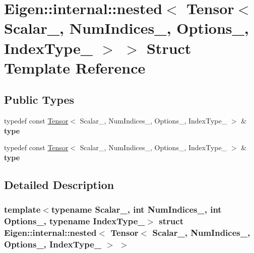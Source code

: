 \hypertarget{struct_eigen_1_1internal_1_1nested_3_01_tensor_3_01_scalar___00_01_num_indices___00_01_options___00_01_index_type___01_4_01_4}{}\section{Eigen\+:\+:internal\+:\+:nested$<$ Tensor$<$ Scalar\+\_\+, Num\+Indices\+\_\+, Options\+\_\+, Index\+Type\+\_\+ $>$ $>$ Struct Template Reference}
\label{struct_eigen_1_1internal_1_1nested_3_01_tensor_3_01_scalar___00_01_num_indices___00_01_options___00_01_index_type___01_4_01_4}
\subsection*{Public Types}
\begin{DoxyCompactItemize}
\item 
\mbox{\label{struct_eigen_1_1internal_1_1nested_3_01_tensor_3_01_scalar___00_01_num_indices___00_01_options___00_01_index_type___01_4_01_4_a275ec6099afff05dc9e63eaea513105a}} 
typedef const \hyperlink{class_eigen_1_1_tensor}{Tensor}$<$ Scalar\+\_\+, Num\+Indices\+\_\+, Options\+\_\+, Index\+Type\+\_\+ $>$ \& {\bfseries type}
\item 
\mbox{\label{struct_eigen_1_1internal_1_1nested_3_01_tensor_3_01_scalar___00_01_num_indices___00_01_options___00_01_index_type___01_4_01_4_a275ec6099afff05dc9e63eaea513105a}} 
typedef const \hyperlink{class_eigen_1_1_tensor}{Tensor}$<$ Scalar\+\_\+, Num\+Indices\+\_\+, Options\+\_\+, Index\+Type\+\_\+ $>$ \& {\bfseries type}
\end{DoxyCompactItemize}


\subsection{Detailed Description}
\subsubsection*{template$<$typename Scalar\+\_\+, int Num\+Indices\+\_\+, int Options\+\_\+, typename Index\+Type\+\_\+$>$\newline
struct Eigen\+::internal\+::nested$<$ Tensor$<$ Scalar\+\_\+, Num\+Indices\+\_\+, Options\+\_\+, Index\+Type\+\_\+ $>$ $>$}



